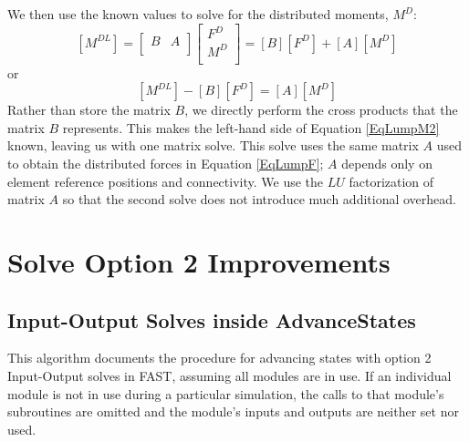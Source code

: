 \documentclass[10pt,letterpaper,oneside,notitlepage]{article}
\begin{document}
We then use the known values to solve for the distributed moments, $M^D$:
\begin{equation}
\label{EqLumpM1}
	\left[	M^{DL} \right]
=
	\begin{bmatrix} B & A \\	\end{bmatrix}
	\begin{bmatrix}
	F^{D} \\
	M^{D} \\
	\end{bmatrix}
= \left[	B \right] \left[	F^D \right] + \left[	A \right] \left[	M^D \right] 
\end{equation}
or
\begin{equation}
\label{EqLumpM2}
\left[	M^{DL} \right] - \left[	B \right] \left[	F^D \right] = \left[	A \right] \left[	M^D \right]
\end{equation}
Rather than store the matrix $B$, we directly perform the cross products that the matrix $B$ represents.
This makes the left-hand side of Equation \ref{EqLumpM2} known, leaving us with one matrix solve. This 
solve uses the same matrix $A$ used to obtain the distributed forces in Equation \ref{EqLumpF}; $A$ depends 
only on element reference positions and connectivity. We use 
the $LU$ factorization of matrix $A$ so that the second solve does not introduce much additional overhead.



\pagebreak %
\section{Solve Option 2 Improvements}
\subsection {Input-Output Solves inside AdvanceStates}
This algorithm documents the procedure for advancing states with option 2 
Input-Output solves in FAST, assuming
all modules are in use. If an individual module is not in use during a particular
simulation, the calls to that module's subroutines are omitted and the module's 
inputs and outputs are neither set nor used.
\end{document}
